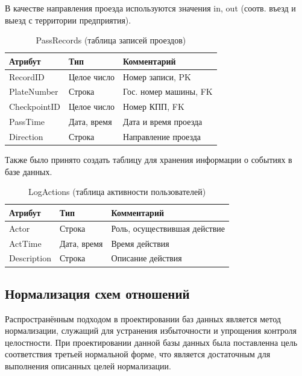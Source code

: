 В качестве направления проезда используются значения in, out (соотв. въезд и выезд с территории предприятия).
\newpage
\begin{table}[h!] 
	\begin{center}
		\caption{PassRecords (таблица записей проездов)}
		\label{pass_table}
		\begin{tabular}{| p{3.8cm} | p{3cm} | p{7.2cm} |}
			\hline
			\textbf{Атрибут}		&	\textbf{Тип}		& \textbf{Комментарий} \\
			\hline
			RecordID	&	Целое число	&	Номер записи, PK \\ \hline
			PlateNumber	&	Строка		&	Гос. номер машины, FK \\ \hline
			CheckpointID &	Целое число	&	Номер КПП, FK \\ \hline
			PassTime 	&	Дата, время	&	Дата и время проезда \\ \hline
			Direction 	&	Строка		&	Направление проезда \\ \hline
		\end{tabular}
	\end{center}
\end{table}

Также было принято создать таблицу для хранения информации о событиях в базе данных.
\begin{table}[h!] 
	\begin{center}
		\caption{LogActions (таблица активности пользователей)}
		\label{tab:log_action}
		\begin{tabular}{| p{3.8cm} | p{3cm} | p{7.2cm} |}
			\hline
			\textbf{Атрибут}		&	\textbf{Тип}		& \textbf{Комментарий} \\
			\hline
			Actor	&	Строка	&	Роль, осуществившая действие \\ \hline
			ActTime	&	Дата, время		&	Время действия \\ \hline
			Description &	Строка	&	Описание действия \\ \hline
		\end{tabular}
	\end{center}
\end{table}

\subsection{Нормализация схем отношений}
Распространённым подходом в проектировании баз данных является метод нормализации, служащий для устранения избыточности и упрощения контроля целостности. При проектировании данной базы данных была поставленна цель соответствия третьей нормальной форме, что является достаточным для выполнения описанных целей нормализации\cite{norm_db}.

